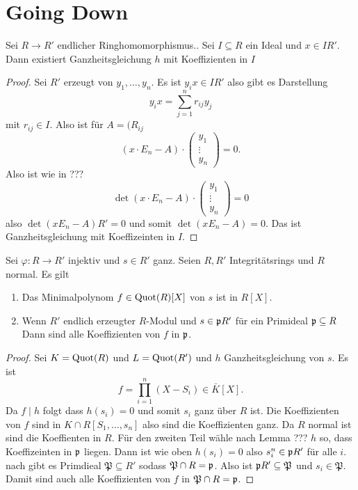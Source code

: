 \section{Going Down}
\begin{Lemma}\label{Lem:GanzGlIdeal}
	Sei \( R \to R' \) endlicher Ringhomomorphismus.. Sei \( I \subseteq R \) ein Ideal und
	\( x\in IR'\). Dann existiert Ganzheitsgleichung \( h \) mit Koeffizienten in \( I \)
\end{Lemma}
\begin{proof}
	Sei \( R'\) erzeugt von \( y_1,\dots,y_n\). Es ist \( y_i x\in IR'\) also gibt es Darstellung
	\[ y_i x= \sum_{j=1}^nr_{ij}y_j\] mit \( r_{ij}\in I\).
	Also ist für \( A= (R_{ij}\)
	\[ (x\cdot E_n-A)\cdot \begin{pmatrix}
		y_1 \\ \vdots \\ y_n
	\end{pmatrix} =0.\]
	Also ist wie in ??? \[ \det(x\cdot E_n-A)\cdot \begin{pmatrix}
		y_1 \\ \vdots \\ y_n
	\end{pmatrix} =0\] also \(\det(xE_n-A)R'=0 \) und somit \(\det(xE_n-A)=0 \). Das ist Ganzheitsgleichung mit Koeffizeinten in \(I\).
\end{proof}
\begin{Lemma}
	Sei \( \varphi \colon R \to R' \) injektiv und \( s \in R'\) ganz. Seien \( R,R'\) Integritätsrings und \( R \) normal.
	Es gilt
	\begin{enumerate}
		\item Das Minimalpolynom \( f \in \operatorname{Quot}(R)[X] \) von \( s \) ist in \( R[X] \).
		\item Wenn \( R' \) endlich erzeugter \( R\)-Modul und \( s \in \mathfrak{p} R'\) für ein Primideal \( \mathfrak{p}\subseteq R \)
		Dann sind alle Koeffizienten von \( f \) in \( \mathfrak{p} \).
	\end{enumerate}
\end{Lemma}
\begin{proof}
	Sei \( K = \operatorname{Quot}(R) \) und \( L= \operatorname{Quot} (R')\) und \( h \) Ganzheitsgleichung von \( s \). Es ist 
	\[ f = \prod_{i=1}^n(X-S_i)\in \bar{K}[X].\]
	Da \( f \mid h \) folgt dass \( h(s_i)=0 \) und somit \( s_i \) ganz über \( R \) ist.
	Die Koeffizienten von \( f \) sind in \( K \cap R[S_1,\dots,s_n]\) also sind die Koeffizienten ganz. Da \( R \) normal ist
	sind die Koeffienten in \( R \).
	Für den zweiten Teil wähle nach Lemma ??? \( h \) so, dass Koeffizeinten in \( \mathfrak{p} \) liegen.
	Dann ist wie oben \( h(s_i)=0 \) also \(s_i^n\in\mathfrak{p} R'\) für alle \( i \).
	nach  gibt es Primdieal \( \mathfrak{P}\subseteq R' \) sodass \( \mathfrak{P} \cap R = \mathfrak{p} \).
	Also ist \( \mathfrak{p} R' \subseteq \mathfrak{P} \) und \( s_i \in \mathfrak{P} \).
	Damit sind auch alle Koeffizienten von \( f \) in \( \mathfrak{P} \cap R = \mathfrak{p} \).
	
\end{proof}
